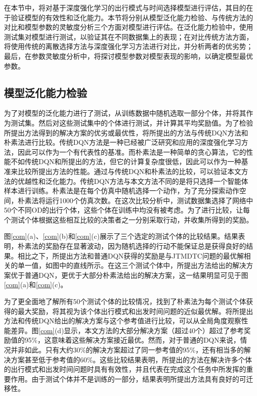 在本节中，将对基于深度强化学习的出行模式与时间选择模型进行评估，其目的在于验证模型的有效性和泛化能力。本节将分别从模型泛化能力检验、与传统方法的对比和模型参数的灵敏度分析三个方面对模型进行评估。在泛化能力检验中，使用测试集对模型进行测试，以验证其在不同数据集上的表现；在对比传统方法方面，将使用传统的离散选择方法与深度强化学习方法进行对比，并分析两者的优劣势；最后，在参数灵敏度分析中，将探讨模型参数对模型表现的影响，以确定模型最优参数。

\subsection{模型泛化能力检验}

为了对模型的泛化能力进行了测试，从训练数据中随机选取一部分个体，并将其作为测试集。然后对这些测试集中的个体进行测试，并计算其平均奖励值。为了检验所提出方法得到的解决方案的优劣或最优性，将所提出的方法与传统DQN方法和朴素法进行比较。传统DQN方法是一种已经被广泛研究和应用的深度强化学习方法，因此可以作为一个有代表性的基准。而朴素法是一种简单的贪心算法，它的性能不如传统DQN和所提出的方法，但它的计算复杂度很低，因此可以作为一种基准来比较所提出方法的性能。通过与传统DQN和朴素法的比较，可以验证本文方法的优越性和泛化能力。传统DQN方法与本文方法不同的是将只选择一个智能体样本进行训练。朴素法是在每个仿真中随机选择一个动作，为了充分探索动作空间，朴素法将运行1000个仿真次数。在这次比较分析中，测试数据集选择了网络中50个不同OD的出行个体，这些个体在训练中均没有被考虑。为了进行比较，让每个测试个体根据这些相互比较的决策者之一分别采取行动，并收集所得到的奖励。

图\ref{com}(a)、\ref{com}(b)和\ref{com}(c)展示了三个选定的测试个体的比较结果。结果表明，朴素法的奖励存在显著波动，因为随机选择的行动不能保证总是获得良好的结果。相比之下，所提出方法和普通DQN获得的奖励是与JTMDTC问题的最优解相关的单一值，如图中的直线所示。在这三个测试个体中，所提出方法给出的解决方案优于普通DQN，更优于大部分朴素法给出的解决方案，这一结果明显可见于图\ref{com}(a)和\ref{com}(c)。

为了更全面地了解所有50个测试个体的比较情况，找到了朴素法为每个测试个体获得的最大奖励，将其视为该个体出行模式和出发时间问题的近似最优解。将所提出方法和传统DQN给出的解决方案与这个参考值进行比较，可以从全局角度观察性能差异。图\ref{com}(d)显示，本文方法的大部分解决方案（超过40个）超过了参考奖励值的95\%，这意味着这些解决方案接近最优。然而，对于普通的DQN来说，情况并非如此。只有大约30\%的解决方案超过了同一参考值的95\%，还有相当多的解决方案甚至低于参考值的60\%。这些比较结果表明，所提出的方法在解决许多个体的出行模式和出发时间问题时具有有效性，并且代表在完成这个任务中所发挥的重要作用。由于测试个体并不是训练的一部分，结果表明所提出方法具有良好的可迁移性。

